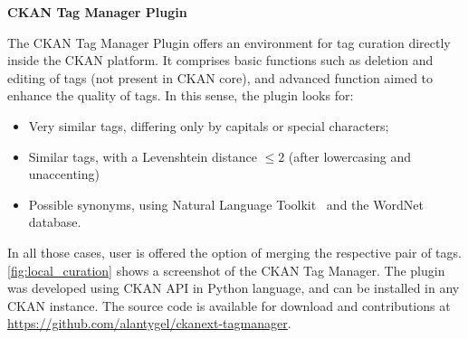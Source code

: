\noindent\textbf{CKAN Tag Manager Plugin}

The CKAN Tag Manager Plugin offers an environment for tag curation directly inside the CKAN platform. 
It comprises basic functions such as deletion and editing of tags (not present in CKAN core), and advanced function aimed to enhance the quality of tags.
In this sense, the plugin looks for:
\begin{itemize}
	\item Very similar tags, differing only by capitals or special characters;
	\item Similar tags, with a Levenshtein distance $\le 2$ (after lowercasing and unaccenting)
	\item Possible synonyms, using Natural Language Toolkit~\cite{Bird2009} and the WordNet database.
\end{itemize}
In all those cases, user is offered the option of merging the respective pair of tags.
\autoref{fig:local_curation} shows a screenshot of the CKAN Tag Manager.
The plugin was developed using CKAN API in Python language, and can be installed in any CKAN instance. The source code is available for download and contributions at \url{https://github.com/alantygel/ckanext-tagmanager}.


